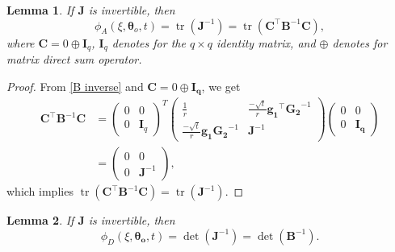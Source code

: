 \documentclass[
]{book}
\newtheorem{lemma}{Lemma}[chapter]
\theoremstyle{definition}
\theoremstyle{definition}
\theoremstyle{definition}
\theoremstyle{definition}
\theoremstyle{remark}
\begin{document}
\begin{lemma}
\protect\hypertarget{lem:loss-A}{}\label{lem:loss-A}If \(\boldsymbol{J}\) is invertible, then
\begin{equation*}
  \phi_A(\xi,\boldsymbol{\theta}_o,t)=\operatorname{tr}(\boldsymbol{J}^{-1})=\operatorname{tr}(\boldsymbol{C}^\top\boldsymbol{B}^{-1}\boldsymbol{C}),
  \end{equation*}
where \(\boldsymbol{C}=0\oplus \boldsymbol{I}_q\), \(\boldsymbol{I}_q\) denotes for the \(q\times q\) identity matrix, and \(\oplus\) denotes for matrix direct sum operator.
\end{lemma}

\begin{proof}
From \eqref{B inverse} and \(\boldsymbol{C}=0\oplus \boldsymbol{I_q}\), we get
\begin{align*}
    \boldsymbol{C}^\top\boldsymbol{B}^{-1}\boldsymbol{C}&=  \begin{pmatrix}
                                0   &   0\\
                                0   &   \boldsymbol{I}_q
                                \end{pmatrix}^T\begin{pmatrix}
            \frac{1}{r}             &   \frac{-\sqrt{t}}{r}\boldsymbol{g_1}^\top\boldsymbol{G_2}^{-1}   \\
            \frac{-\sqrt{t}}{r}\boldsymbol{g_1}\boldsymbol{G_2}^{-1}    &\boldsymbol{J}^{-1}
            \end{pmatrix}\begin{pmatrix}
                                0   &   0\\
                                0   &   \boldsymbol{I_q}
                                \end{pmatrix}\\
                            &= \begin{pmatrix}
                                0   &   0\\
                                0   &   \boldsymbol{J}^{-1}
                                \end{pmatrix},
    \end{align*}
which implies \(\operatorname{tr}(\boldsymbol{C}^\top\boldsymbol{B}^{-1}\boldsymbol{C})=\operatorname{tr}(\boldsymbol{J}^{-1})\).
\end{proof}

\begin{lemma}
\protect\hypertarget{lem:loss-D}{}\label{lem:loss-D}If \(\boldsymbol{J}\) is invertible, then
\begin{equation*}
    \phi_D(\xi,\boldsymbol{\theta_o},t)=\det(\boldsymbol{J}^{-1})=\det(\boldsymbol{B}^{-1}).
\end{equation*}
\end{lemma}
\end{document}
